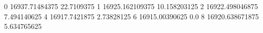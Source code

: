 0 16937.71484375 22.7109375
1 16925.162109375 10.158203125
2 16922.498046875 7.494140625
4 16917.7421875 2.73828125
6 16915.00390625 0.0
8 16920.638671875 5.634765625

